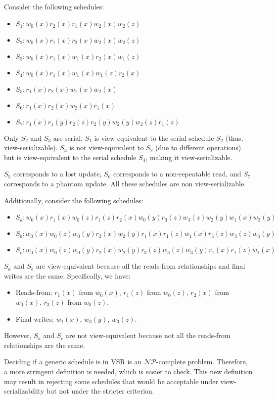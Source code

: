 \begin{example}
    Consider the following schedules:
    \begin{itemize}
        \item $S_1: w_0(x) r_2(x) r_1(x) w_2(x) w_2(z)$
        \item $S_2: w_0(x) r_1(x) r_2(x) w_2(x) w_2(z)$
        \item $S_3: w_0(x) r_1(x) w_1(x) r_2(x) w_1(z)$
        \item $S_4: w_0(x) r_1(x) w_1(x) w_1(z) r_2(x)$
        \item $S_5: r_1(x) r_2(x) w_1(x) w_2(x)$
        \item $S_6: r_1(x) r_2(x) w_2(x) r_1(x)$
        \item $S_7: r_1(x) r_1(y) r_2(z) r_2(y) w_2(y) w_2(z) r_1(z)$
    \end{itemize}
    Only $S_2$ and $S_3$ are serial.
    $S_1$ is view-equivalent to the serial schedule $S_2$ (thus, view-serializable). 
    $S_3$ is not view-equivalent to $S_2$ (due to different operations) but is view-equivalent to the serial schedule $S_4$, making it view-serializable.

    $S_5$ corresponds to a lost update, $S_6$ corresponds to a non-repeatable read, and $S_7$ corresponds to a phantom update. All these schedules are non view-serializable. 
    
    Additionally, consider the following schedules:
    \begin{itemize}
        \item $S_a: w_0(x) r_1(x) w_0(z) r_1(z) r_2(x) w_0(y) r_3(z) w_3(z) w_2(y) w_1(x) w_3(y)$
        \item $S_b: w_0(x) w_0(z) w_0(y) r_2(x) w_2(y) r_1(x) r_1(z) w_1(x) r_3(z) w_3(z) w_3(y)$
        \item $S_c: w_0(x) w_0(z) w_0(y) r_2(x) w_2(y) r_3(z) w_3(z) w_3(y) r_1(x) r_1(z) w_1(x)$
    \end{itemize}
    $S_a$ and $S_b$ are view-equivalent because all the reads-from relationships and final writes are the same. 
    Specifically, we have: 
    \begin{itemize}
        \item Reads-from: $r_1(x)$ from $w_0(x)$, $r_1(z)$ from $w_0(z)$, $r_2(x)$ from $w_0(x)$, $r_3(z)$ from $w_0(z)$.
        \item Final writes: $w_1(x)$, $w_3(y)$, $w_3(z)$.
    \end{itemize}
    However, $S_a$ and $S_c$ are not view-equivalent because not all the reads-from relationships are the same.
\end{example}

Deciding if a generic schedule is in VSR is an $\mathcal{NP}$-complete problem. 
Therefore, a more stringent definition is needed, which is easier to check.
This new definition may result in rejecting some schedules that would be acceptable under view-serializability but not under the stricter criterion.